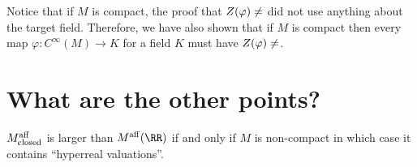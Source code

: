 \documentclass[12pt]{article}
\begin{document}
\begin{rmk}
Notice that if $M$ is compact, the proof that $Z(\varphi) \neq \empty$ did not use anything about the target field. Therefore, we have also shown that if $M$ is compact then every map $\varphi : C^{\infty}(M) \to K$ for a field $K$ must have $Z(\varphi) \neq \empty$. 
\end{rmk}

\section{What are the other points?}

\newcommand{\cU}{\mathcal{U}}

\begin{prop}
$M^{\mathrm{aff}}_{\text{closed}}$ is larger than $M^{\aff}(\RR)$ if and only if $M$ is non-compact in which case it contains ``hyperreal valuations''.
\end{prop}
\end{document}
